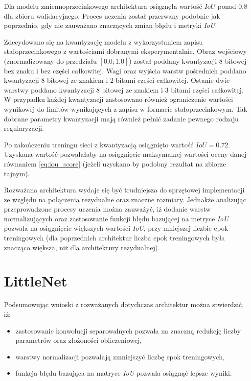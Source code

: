 Dla modelu zmiennoprzecinkowego architektura osiągnęła wartość $IoU$ ponad $0.8$ dla zbioru walidacyjnego. Proces uczenia został przerwany podobnie jak poprzednio, gdy nie zauważano znaczących zmian błędu i metryki \emph{IoU}.

Zdecydowano się na kwantyzację modelu z wykorzystaniem zapisu stałoprzecinkowego z wartościami dobranymi eksperymentalnie. 
Obraz wejściowy (znormalizowany do przedziału $[0.0;1.0]$) został poddany kwantyzacji 8 bitowej bez znaku i bez części całkowitej. 
Wagi oraz wyjścia warstw pośrednich poddano kwantyzacji 8 bitowej ze znakiem i 2 bitami części całkowitej.
Ostanie dwie warstwy poddano kwantyzacji 8 bitowej ze znakiem i 3 bitami części całkowitej.
W przypadku każdej kwantyzacji zastosowano również ograniczenie wartości wynikowej do limitów wynikających z zapisu w formacie stałoprzecinkowym. 
Tak dobrane parametry kwantyzacji mają również pełnić zadanie pewnego rodzaju regularyzacji.

Po zakończeniu treningu sieci z kwantyzacją osiągnięto wartość $IoU = 0.72$.
Uzyskana wartość pozwalałaby na osiągnięcie maksymalnej wartości oceny 
danej równaniem \eqref{eq:iou_score} (jeżeli uzyskano by podobny rezultat na zbiorze tajnym).

Rozważana architektura wydaje się być trudniejsza do sprzętowej implementacji ze względu na połączenia rezydualne oraz znaczne rozmiary. 
Jednakże analizując przeprowadzone procesy uczenia można zauważyć, iż dodanie warstw normalizujących oraz zastosowanie funkcji błędu bazującej na metryce \emph{IoU} pozwala na osiągnięcie większych wartości \emph{IoU}, przy mniejszej liczbie epok treningowych 
(dla poprzednich architektur liczba epok treningowych była znacząco większa, niż dla architektury rezydualnej). 


\section{LittleNet}
\label{ch:LN}

Podsumowując wnioski z rozważanych dotychczas architektur można stwierdzić, iż:
\begin{itemize}
    \item zastosowanie konwolucji separowalnych pozwala na znaczną redukcję liczby parametrów oraz złożoności obliczeniowej, 
    \item warstwy normalizacji pozwalają zmniejszyć liczbę epok treningowych,
    \item funkcja błędu bazująca na matryce \emph{IoU} pozwala osiągnąć lepsze wyniki.
\end{itemize}

